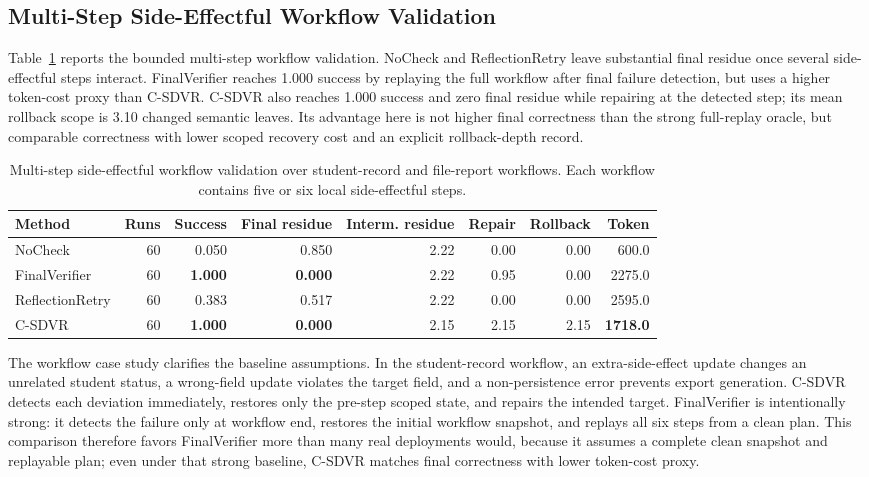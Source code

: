 \documentclass[pdflatex,sn-apa]{sn-jnl}
\begin{document}
\subsection{Multi-Step Side-Effectful Workflow Validation}

Table~\ref{tab:workflow} reports the bounded multi-step workflow validation. NoCheck and ReflectionRetry leave substantial final residue once several side-effectful steps interact. FinalVerifier reaches 1.000 success by replaying the full workflow after final failure detection, but uses a higher token-cost proxy than C-SDVR. C-SDVR also reaches 1.000 success and zero final residue while repairing at the detected step; its mean rollback scope is 3.10 changed semantic leaves. Its advantage here is not higher final correctness than the strong full-replay oracle, but comparable correctness with lower scoped recovery cost and an explicit rollback-depth record.

\begin{table}[htbp]
\centering
\caption{Multi-step side-effectful workflow validation over student-record and file-report workflows. Each workflow contains five or six local side-effectful steps.}
\label{tab:workflow}
\small
\setlength{\tabcolsep}{3.2pt}
\begin{tabular}{lrrrrrrr}
\toprule
Method & Runs & Success & Final residue & Interm. residue & Repair & Rollback & Token \\
\midrule
NoCheck & 60 & 0.050 & 0.850 & 2.22 & 0.00 & 0.00 & 600.0 \\
FinalVerifier & 60 & \textbf{1.000} & \textbf{0.000} & 2.22 & 0.95 & 0.00 & 2275.0 \\
ReflectionRetry & 60 & 0.383 & 0.517 & 2.22 & 0.00 & 0.00 & 2595.0 \\
C-SDVR & 60 & \textbf{1.000} & \textbf{0.000} & 2.15 & 2.15 & 2.15 & \textbf{1718.0} \\
\bottomrule
\end{tabular}
\end{table}

The workflow case study clarifies the baseline assumptions. In the student-record workflow, an extra-side-effect update changes an unrelated student status, a wrong-field update violates the target field, and a non-persistence error prevents export generation. C-SDVR detects each deviation immediately, restores only the pre-step scoped state, and repairs the intended target. FinalVerifier is intentionally strong: it detects the failure only at workflow end, restores the initial workflow snapshot, and replays all six steps from a clean plan. This comparison therefore favors FinalVerifier more than many real deployments would, because it assumes a complete clean snapshot and replayable plan; even under that strong baseline, C-SDVR matches final correctness with lower token-cost proxy.
\end{document}
